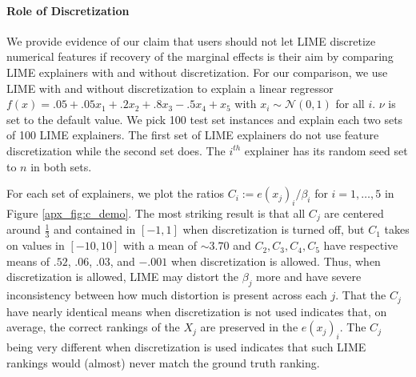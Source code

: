 \documentclass[mnsc,blindrev]{informs3}
\begin{document}
    
                \paragraph{Role of Discretization}
                    We provide evidence of our claim that users should not let LIME discretize numerical features if recovery of the marginal effects is their aim by comparing LIME explainers with and without discretization. For our comparison, we use LIME with and without discretization to explain a linear regressor $f(x) = .05 + .05x_1+ .2x_2+ .8x_3 -.5x_4 +x_5$ with $x_i \sim \mathcal{N}(0,1)$ for all $i$. $\nu$ is set to the default value. We pick 100 test set instances and explain each two sets of 100 LIME explainers. The first set of LIME explainers do not use feature discretization while the second set does. The $i^{th}$ explainer has its random seed set to $n$ in both sets. 


                For each set of explainers, we plot the ratios $C_i:= e(x_j)_i/\beta_i$ for $i=1,\ldots,5$ in Figure \ref{apx_fig:c_demo}. The most striking result is that all $C_j$ are centered around $\frac{1}{3}$ and contained in $[-1,1]$ when discretization is turned off, but $C_1$ takes on values in $[-10,10]$ with a mean of $\sim 3.70$ and $C_2,C_3,C_4,C_5$ have respective means of $.52$, $.06$, $.03$, and $-.001$ when discretization is allowed. Thus, when discretization is allowed, LIME may distort the $\beta_j$ more and have severe inconsistency between how much distortion is present across each $j$. That the $C_j$ have nearly identical means when discretization is not used indicates that, on average, the correct rankings of the $X_j$ are preserved in the $e(x_j)_i$. The $C_j$ being very different when discretization is used indicates that such LIME rankings would (almost) never match the ground truth ranking. 
                
\end{document}
